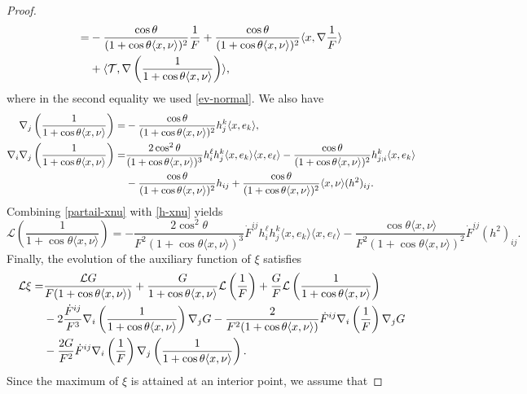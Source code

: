 \documentclass[10pt,a4paper]{amsart}
\begin{document}
\begin{proof}
\begin{align}
	=&-\frac{\cos\theta}{(1+\cos\theta\langle x,\nu\rangle)^2}\frac{1}{F}+\frac{\cos\theta}{(1+\cos\theta\langle x,\nu\rangle)^2}\langle x,\nabla \frac{1}{F}\rangle\notag\\
	&+\langle \mathcal{T},\nabla\left(\frac{1}{1+\cos\theta\langle x,\nu\rangle}\right)\rangle,\label{partail-xnu}
\end{align}
where in the second equality we used \eqref{ev-normal}.
We also have
\begin{align}
	\nabla_j\left(\frac{1}{1+\cos\theta\langle x,\nu\rangle}\right)=&-\frac{\cos\theta}{(1+\cos\theta\langle x,\nu\rangle)^2}h_j^k\langle x,e_k\rangle,\label{n-xnu}\\
	\nabla_i\nabla_j\left(\frac{1}{1+\cos\theta\langle x,\nu\rangle}\right)=&\frac{2\cos^2\theta}{(1+\cos\theta\langle x,\nu\rangle)^3}h_i^{\ell}h_j^k \langle x,e_k\rangle\langle x,e_{\ell}\rangle-\frac{\cos\theta}{(1+\cos\theta\langle x,\nu\rangle)^2}h_{j;i}^k\langle x,e_k\rangle\notag\\
	&-\frac{\cos\theta}{(1+\cos\theta\langle x,\nu\rangle)^2}h_{ij}+\frac{\cos\theta}{(1+\cos\theta\langle x,\nu\rangle)^2}\langle x,\nu\rangle(h^2)_{ij}.\label{h-xnu}
\end{align}
Combining \eqref{partail-xnu} with \eqref{h-xnu} yields
\begin{equation}
	\mathcal{L}\left(\frac{1}{1+\cos\theta\langle x,\nu\rangle}\right)=-\frac{2\cos^2\theta}{F^2(1+\cos\theta\langle x,\nu\rangle)^3}\dot{F}^{ij}h_i^{\ell}h_j^k \langle x,e_k\rangle\langle x,e_{\ell}\rangle-\frac{\cos\theta\langle x,\nu\rangle
	}{F^2(1+\cos\theta\langle x,\nu\rangle)^2}\dot{F}^{ij}(h^2)_{ij}.\label{L1xnu}
\end{equation}
Finally,  the evolution of the auxiliary function of $\xi$ satisfies
\begin{align}
	\mathcal{L}{\xi}=&\frac{\mathcal{L}G}{F(1+\cos\theta\langle x,\nu \rangle)}+\frac{G}{1+\cos\theta\langle x,\nu \rangle}\mathcal{L}\left(\frac{1}{F}\right)+\frac{G}{F}\mathcal{L}\left(\frac{1}{1+\cos\theta\langle x,\nu \rangle}\right)\notag\\
	&-2\frac{\dot{F}^{ij}}{F^3}\nabla_i\left(\frac{1}{1+\cos\theta\langle x,\nu \rangle}\right)\nabla_j{G}-\frac{2}{F^2(1+\cos\theta\langle x,\nu \rangle)}\dot{F}^{ij}\nabla_i\left(\frac{1}{F}\right)\nabla_j G\notag\\
	&-\frac{2G}{F^2}\dot{F}^{ij}\nabla_i\left(\frac{1}{F}\right)\nabla_j\left(\frac{1}{1+\cos\theta\langle x,\nu \rangle}\right).\label{Lxi-1}
\end{align}
Since the maximum of $\xi$ is attained at an interior point, we assume that 

\end{proof}
\end{document}

